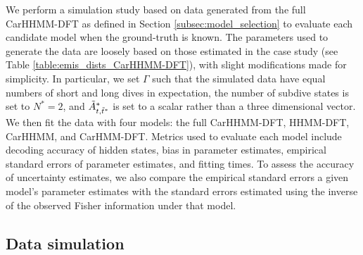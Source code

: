 
We perform a simulation study based on data generated from the full CarHHMM-DFT as defined in Section \ref{subsec:model_selection} to evaluate each candidate model when the ground-truth is known. The parameters used to generate the data are loosely based on those estimated in the case study (see Table \ref{table:emis_dists_CarHHMM-DFT}), with slight modifications made for simplicity. In particular, we set $\Gamma$ such that the simulated data have equal numbers of short and long dives in expectation, the number of subdive states is set to $N^*=2$, and $\tilde{A}^*_{t,\tilde t^*}$ is set to a scalar rather than a three dimensional vector. We then fit the data with four models: the full CarHHMM-DFT, HHMM-DFT, CarHHMM, and CarHMM-DFT. Metrics used to evaluate each model include decoding accuracy of hidden states, bias in parameter estimates, empirical standard errors of parameter estimates, and fitting times. To assess the accuracy of uncertainty estimates, we also compare the empirical standard errors a given model's parameter estimates with the standard errors estimated using the inverse of the observed Fisher information under that model.

\subsection{Data simulation}
\label{subsec:data_simulation}

